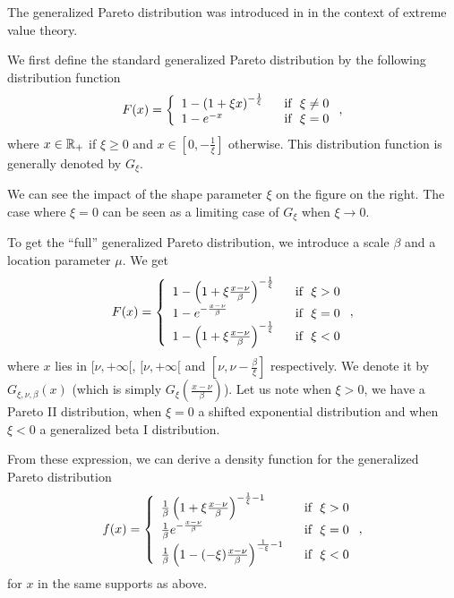 The generalized Pareto distribution was introduced in \cite{tve} in the context of extreme value theory.

We first define the standard generalized Pareto distribution by the following distribution function
$$
F(x) = \left\{
\begin{array}{ll}
1- \left(1+\xi x\right)^{-\frac{1}{\xi}} & \textrm{~~if~~} \xi \neq 0\\
1-e^{-x} & \textrm{~~if~~} \xi=0\\
\end{array}
\right. ,
$$
where $x\in\mathbb R_+$ if $\xi\geq 0$ and $x\in\left[0, -\frac{1}{\xi}\right]$ otherwise. This distribution function is generally denoted by $G_\xi$.  

We can see the impact of the shape parameter $\xi$ on the figure on the right. The case where $\xi=0$ can be seen as a limiting case of $G_\xi$ when $\xi\rightarrow 0$.

To get the ``full'' generalized Pareto distribution, we introduce a scale $\beta$ and a location parameter $\mu$. We get
$$
F(x) = \left\{
\begin{array}{ll}
1- \left(1+\xi \frac{x-\nu}{\beta}\right)^{-\frac{1}{\xi}} & \textrm{~~if~~} \xi > 0\\
1-e^{-\frac{x-\nu}{\beta}} & \textrm{~~if~~} \xi=0\\
1- \left(1+\xi \frac{x-\nu}{\beta}\right)^{-\frac{1}{\xi}} & \textrm{~~if~~} \xi < 0\\
\end{array}
\right. ,
$$
where $x$ lies in $[\nu,+\infty[$, $[\nu,+\infty[$ and $\left[\nu, \nu-\frac{\beta}{\xi}\right]$ respectively. We denote it by $G_{\xi,\nu,\beta}(x)$ (which is simply $G_{\xi}(\frac{x-\nu}{\beta})$). Let us note when $\xi>0$, we have a Pareto II distribution, when $\xi=0$ a shifted exponential distribution and when $\xi<0$ a generalized beta I distribution.

From these expression, we can derive a density function for the generalized Pareto distribution
$$
f(x) = \left\{
\begin{array}{ll}
\frac{1}{\beta} \left(1+\xi \frac{x-\nu}{\beta}\right)^{-\frac{1}{\xi}-1} & \textrm{~~if~~} \xi > 0\\
\frac{1}{\beta} e^{-\frac{x-\nu}{\beta}} & \textrm{~~if~~} \xi=0\\
\frac{1}{\beta} \left(1-(-\xi) \frac{x-\nu}{\beta}\right)^{\frac{1}{-\xi}-1} & \textrm{~~if~~} \xi < 0\\
\end{array}
\right. ,
$$
for $x$ in the same supports as above. 


